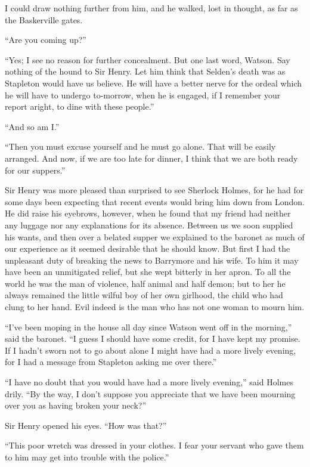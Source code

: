 \documentclass[paper=a5,BCOR=7mm,twoside,DIV=calc,12pt,usegeometry,openany,chapterprefix,endperiod,headings=big]{scrbook} %
\begin{document}
I could draw nothing further from him, and he walked, lost in thought, as far as the Baskerville gates.

\enquote{Are you coming up?}

\enquote{Yes; I see no reason for further concealment. But one last word, Watson. Say nothing of the hound to Sir Henry. Let him think that Selden's death was as Stapleton would have us believe. He will have a better nerve for the ordeal which he will have to undergo to-morrow, when he is engaged, if I remember your report aright, to dine with these people.}

\enquote{And so am I.}

\enquote{Then you must excuse yourself and he must go alone. That will be easily arranged. And now, if we are too late for dinner, I think that we are both ready for our suppers.}

Sir Henry was more pleased than surprised to see Sherlock \newline Holmes, for he had for some days been expecting that recent events would bring him down from London. He did raise his eyebrows, however, when he found that my friend had neither any luggage nor any explanations for its absence. Between us we soon supplied his wants, and then over a belated supper we explained to the baronet as much of our experience as it seemed desirable that he should know. But first I had the unpleasant duty of breaking the news to Barrymore and his wife. To him it may have been an unmitigated relief, but she wept bitterly in her apron. To all the world he was the man of violence, half animal and half demon; but to her he always remained the little wilful boy of her own girlhood, the child who had clung to her hand. Evil indeed is the man who has not one woman to mourn him.

\enquote{I've been moping in the house all day since Watson went off in the morning,} said the baronet. \enquote{I guess I should have some credit, for I have kept my promise. If I hadn't sworn not to go about alone I might have had a more lively evening, for I had a message from Stapleton asking me over there.}

\enquote{I have no doubt that you would have had a more lively evening,} said Holmes drily. \enquote{By the way, I don't suppose you appreciate that we have been mourning over you as having broken your neck?}

Sir Henry opened his eyes. \enquote{How was that?}

\enquote{This poor wretch was dressed in your clothes. I fear your servant who gave them to him may get into trouble with the police.}
\end{document}
